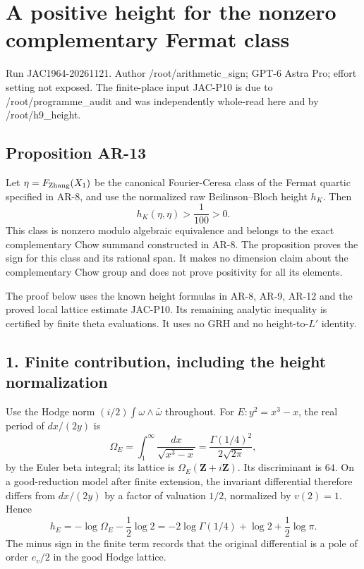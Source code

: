\section{A positive height for the nonzero complementary Fermat
class}\label{a-positive-height-for-the-nonzero-complementary-fermat-class}

Run JAC1964-20261121. Author /root/arithmetic\_sign; GPT-6 Astra Pro;
effort setting not exposed. The finite-place input JAC-P10 is due to
/root/programme\_audit and was independently whole-read here and by
/root/h9\_height.

\subsection{Proposition AR-13}\label{proposition-ar-13}

Let \(\eta=F_{\rm Zhang}(X_1)\) be the canonical Fourier-Ceresa class of
the Fermat quartic specified in AR-8, and use the normalized raw
Beilinson--Bloch height \(h_K\). Then \[
h_K(\eta,\eta)>\frac1{100}>0.
\tag{AR.22}
\] This class is nonzero modulo algebraic equivalence and belongs to the
exact complementary Chow summand constructed in AR-8. The proposition
proves the sign for this class and its rational span. It makes no
dimension claim about the complementary Chow group and does not prove
positivity for all its elements.

The proof below uses the known height formulas in AR-8, AR-9, AR-12 and
the proved local lattice estimate JAC-P10. Its remaining analytic
inequality is certified by finite theta evaluations. It uses no GRH and
no height-to-\(L'\) identity.

\subsection{1. Finite contribution, including the height
normalization}\label{finite-contribution-including-the-height-normalization}

Use the Hodge norm \((i/2)\int\omega\wedge\bar\omega\) throughout. For
\(E:y^2=x^3-x\), the real period of \(dx/(2y)\) is \[
\Omega_E=\int_1^\infty\frac{dx}{\sqrt{x^3-x}}
 =\frac{\Gamma(1/4)^2}{2\sqrt{2\pi}},
\] by the Euler beta integral; its lattice is
\(\Omega_E(\mathbf Z+i\mathbf Z)\). Its discriminant is \(64\). On a
good-reduction model after finite extension, the invariant differential
therefore differs from \(dx/(2y)\) by a factor of valuation \(1/2\),
normalized by \(v(2)=1\). Hence \[
h_E=-\log\Omega_E-\frac12\log2
   =-2\log\Gamma(1/4)+\log2+\frac12\log\pi.
\tag{AR.23}
\] The minus sign in the finite term records that the original
differential is a pole of order \(e_v/2\) in the good Hodge lattice.

